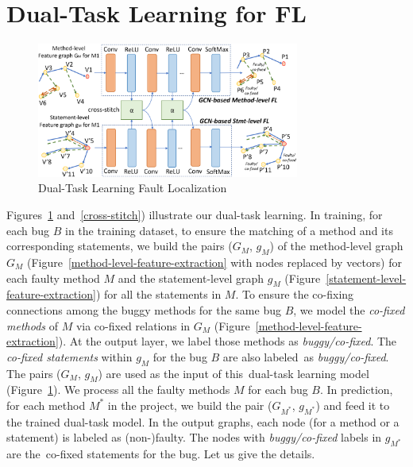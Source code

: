 \section{Dual-Task Learning for FL}
\label{sec:dual-learning}

\begin{figure}[t]
	\centering
	\includegraphics[width=3.4in]{graphs/dual-learning-2.png}
        \vspace{-18pt}
	\caption{Dual-Task Learning Fault Localization}
	\label{dual-learning}
\end{figure}



Figures~\ref{dual-learning} and~\ref{cross-stitch}) illustrate our
dual-task learning. In training, for each bug $B$ in the training
dataset, to ensure the matching of a method and its corresponding
statements, we build the pairs ($G_M$, $g_M$) of the method-level
graph $G_M$ (Figure~\ref{method-level-feature-extraction} with nodes
replaced by vectors) for each faulty method $M$ and the
statement-level graph $g_M$
(Figure~\ref{statement-level-feature-extraction}) for all the
statements in $M$. To ensure the co-fixing connections
among the buggy methods for the same bug $B$, we model the {\em
  co-fixed methods} of $M$ via co-fixed relations in $G_M$
(Figure~\ref{method-level-feature-extraction}). At the output layer, we
label those methods as {\em buggy/co-fixed}. The {\em co-fixed
  statements} within $g_M$ for the bug $B$ are also labeled~as {\em
  buggy/co-fixed}. The pairs ($G_M$, $g_M$) are used as the input of
this~dual-task learning model (Figure~\ref{dual-learning}). We process
all the faulty methods $M$ for each bug $B$. In prediction, for each
method $M^{*}$ in the project, we build the pair ($G_{M^{*}}$,
$g_{M^{*}}$) and feed it to the trained dual-task model. In the output
graphs, each node (for a method or a statement) is
labeled as (non-)faulty. The nodes with {\em buggy/co-fixed}
labels in $g_{M^{*}}$ are the~co-fixed statements for the
bug. Let us give the details.

